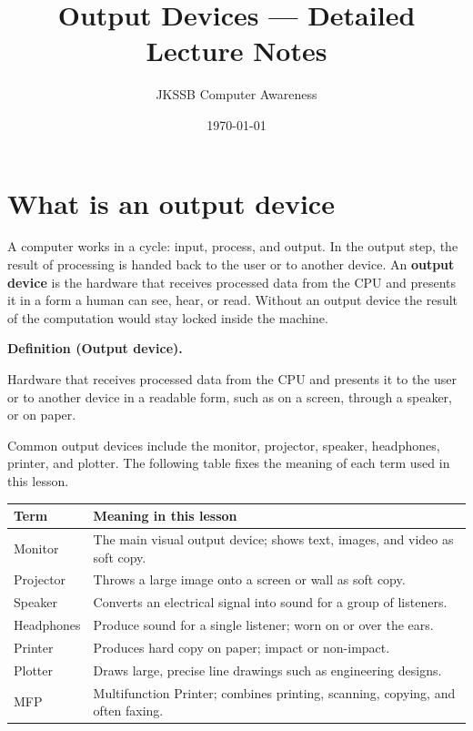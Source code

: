 \documentclass[11pt]{article}
\title{Output Devices --- Detailed Lecture Notes}
\author{JKSSB Computer Awareness}
\date{\today}
\newenvironment{definitionbox}[1]{%
  \par\noindent\textbf{Definition (#1).}\ \itshape
}{\par\vspace{0.3em}}
\begin{document}
\maketitle

\section{What is an output device}
A computer works in a cycle: input, process, and output. In the output step,
the result of processing is handed back to the user or to another device. An
\textbf{output device} is the hardware that receives processed data from the
CPU and presents it in a form a human can see, hear, or read. Without an
output device the result of the computation would stay locked inside the
machine.

\begin{definitionbox}{Output device}
Hardware that receives processed data from the CPU and presents it to the
user or to another device in a readable form, such as on a screen, through a
speaker, or on paper.
\end{definitionbox}

Common output devices include the monitor, projector, speaker, headphones,
printer, and plotter. The following table fixes the meaning of each term used
in this lesson.

\begin{center}
\begin{tabular}{p{}p{}}
\toprule
\textbf{Term} & \textbf{Meaning in this lesson} \\
\midrule
Monitor & The main visual output device; shows text, images, and video as soft copy. \\
Projector & Throws a large image onto a screen or wall as soft copy. \\
Speaker & Converts an electrical signal into sound for a group of listeners. \\
Headphones & Produce sound for a single listener; worn on or over the ears. \\
Printer & Produces hard copy on paper; impact or non-impact. \\
Plotter & Draws large, precise line drawings such as engineering designs. \\
MFP & Multifunction Printer; combines printing, scanning, copying, and often faxing. \\
\bottomrule
\end{tabular}
\end{center}
\end{document}
